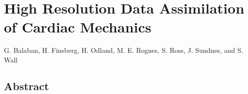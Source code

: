 
\renewcommand{\thefootnote}{\fnsymbol{footnote}}
\section*{High Resolution Data Assimilation of Cardiac Mechanics}

\begin{center}
G. Balaban\footnotemark,
H. Finsberg\footnotemark[\value{footnote}], 
H. Odland, M. E. Rognes,
S. Ross, J. Sundnes, and
S. Wall
\end{center}



\subsection*{Abstract}


